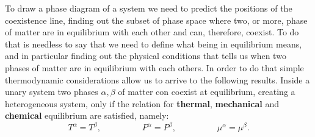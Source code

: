 To draw a phase diagram of a system we need to predict the positions of the coexistence line, finding out the subset of phase space where two, or more, phase of matter are in equilibrium with each other and can, therefore, coexist. To do that is needless to say that we need to define what being in equilibrium means, and in particular finding out the physical conditions that tells us when two phases of matter are in equilibrium with each others. In order to do that simple thermodynamic considerations allow us to arrive to the following results.
{
    Inside a unary system two phases $\alpha, \beta$ of matter con coexist at equilibrium, creating a heterogeneous system, only if the relation for \textbf{thermal}, \textbf{mechanical} and \textbf{chemical} equilibrium are satisfied, namely:
    \begin{equation}
        \label{eq:equiCond}
        T^\alpha = T^\beta, \hspace{2cm} P^\alpha = P^\beta, \hspace{2cm} \mu^\alpha = \mu^\beta.
    \end{equation}
}
